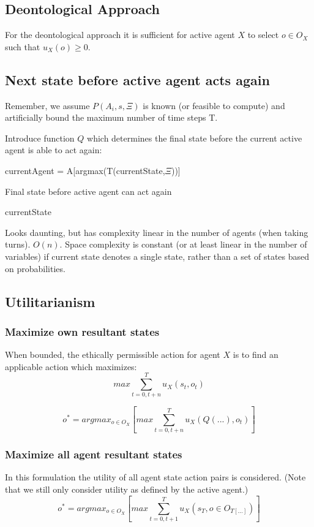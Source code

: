 \documentclass{article}
\begin{document}
\subsection{Deontological Approach}
For the deontological approach it is sufficient for active agent $X$ to select $o \in O_X$ such that $u_X(o) \geq 0$.


\subsection{Next state before active agent acts again}
Remember, we assume $P(A_i, s, \Xi)$ is known (or feasible to compute) and artificially bound the maximum number of time steps T.

Introduce function $Q$ which determines the final state before the current active agent is able to act again:
\newline

\begin{algorithm}[H]
\SetAlgoLined
 currentAgent = A[argmax(T(currentState,$\Xi$))]\;
 \caption{Final state before active agent can act again}
 \Return currentState\;
\end{algorithm}

Looks daunting, but has complexity linear in the number of agents (when taking turns). $O(n)$. Space complexity is constant (or at least linear in the number of variables) if current state denotes a single state, rather than a set of states based on probabilities.

\subsection{Utilitarianism}

\subsubsection*{Maximize own resultant states}
When bounded, the ethically permissible action for agent $X$ is to find an applicable action which maximizes:
\[max \sum_{t=0, t+n}^T  u_X(s_t,o_t)\]

\[
o^*=argmax_{o \in O_X} \left[max \sum_{t=0, t+n}^T  u_X(Q(...),o_t) \right]
\]

\subsubsection*{Maximize all agent resultant states}
In this formulation the utility of all agent state action pairs is considered. (Note that we still only consider utility as defined by the active agent.)
\[
o^*=argmax_{o \in O_X} \left[max \sum_{t=0, t+1}^T  u_{X}(s_T, o \in O_{T[...]}) \right]
\]
\end{document}
